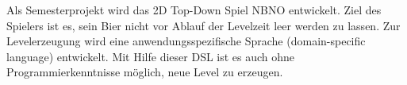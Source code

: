 Als Semesterprojekt wird das 2D Top-Down Spiel NBNO entwickelt.
Ziel des Spielers ist es, sein Bier nicht vor Ablauf der Levelzeit leer werden zu lassen.
Zur Levelerzeugung wird eine anwendungsspezifische Sprache (domain-specific language) entwickelt. Mit Hilfe dieser DSL ist es auch ohne Programmierkenntnisse möglich, neue Level zu erzeugen.